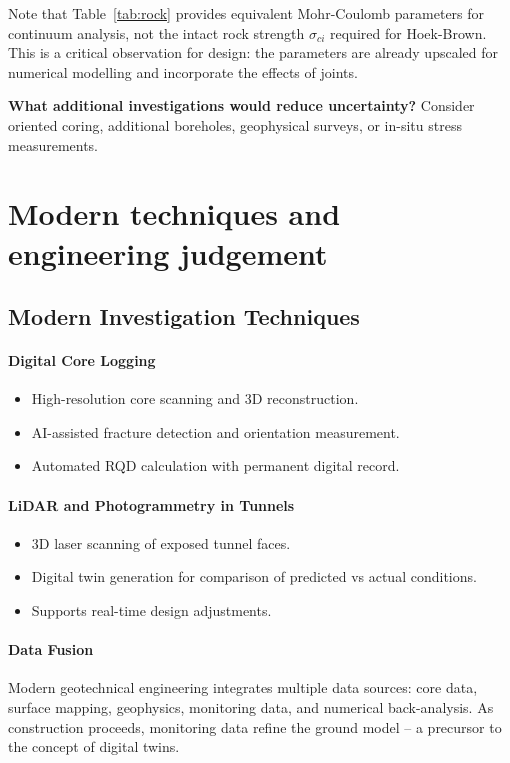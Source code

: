 Note that Table~\ref{tab:rock} provides equivalent Mohr-Coulomb parameters for continuum analysis, not the intact rock strength $\sigma_{ci}$ required for Hoek-Brown. This is a critical observation for design: the parameters are already upscaled for numerical modelling and incorporate the effects of joints.

\textbf{What additional investigations would reduce uncertainty?} Consider oriented coring, additional boreholes, geophysical surveys, or in-situ stress measurements.

\section{Modern techniques and engineering judgement}
\label{sec:modern-techniques-and-engineering-judgement}

\subsection{Modern Investigation Techniques}
\paragraph{Digital Core Logging}
\begin{itemize}
 \item High-resolution core scanning and 3D reconstruction.
 \item AI-assisted fracture detection and orientation measurement.
 \item Automated RQD calculation with permanent digital record.
\end{itemize}

\paragraph{LiDAR and Photogrammetry in Tunnels}
\begin{itemize}
 \item 3D laser scanning of exposed tunnel faces.
 \item Digital twin generation for comparison of predicted vs actual conditions.
 \item Supports real-time design adjustments.
\end{itemize}

\paragraph{Data Fusion}
Modern geotechnical engineering integrates multiple data sources: core data, surface mapping, geophysics, monitoring data, and numerical back-analysis. As construction proceeds, monitoring data refine the ground model -- a precursor to the concept of digital twins.


